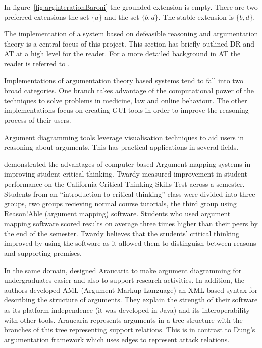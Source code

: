 In figure~\ref{fig:arginterationBaroni} the grounded extension is empty. There are two preferred extensions the set $\{a\}$ and the set $\{b , d\}$. The stable extension is $\{b , d\}$.

The implementation of a system based on defeasible reasoning and argumentation theory is a central focus of this project. This section has briefly outlined DR and AT at a high level for the reader. For a more detailed background in AT the reader is referred to \cite{bench2007argumentation}.

Implementations of argumentation theory based systems tend to fall into two broad categories. One branch takes advantage of the computational power of the techniques to solve problems in medicine, law and online behaviour. The other implementations focus on creating GUI tools in order to improve the reasoning process of their users.

Argument diagramming tools leverage visualisation techniques to aid users in reasoning about arguments. This has practical applications in several fields.

\cite{twardy2004argument} demonstrated the advantages of computer based Argument mapping systems in improving student critical thinking. Twardy measured improvement in student performance on the California Critical Thinking Skills Test across a semester. Students from an ``introduction to critical thinking'' class were divided into three groups, two groups recieving normal course tutorials, the third group using Reason!Able (argument mapping) software. Students who used argument mapping software scored results on average three times higher than their peers by the end of the semester. Twardy believes that the students' critical thinking improved by using the software as it allowed them to distinguish between reasons and supporting premises.

In the same domain, \cite{reed2001araucaria} designed Araucaria to make argument diagramming for undergraduates easier and also to support research activities. In addition, the authors developed AML (Argument Markup Language) an XML based syntax for describing the structure of arguments. They explain the strength of their software as its platform independence (it was developed in Java) and its interoperability with other tools. Araucaria represents arguments in a tree structure with the branches of this tree representing support relations. This is in contrast to Dung's argumentation framework which uses edges to represent attack relations.


